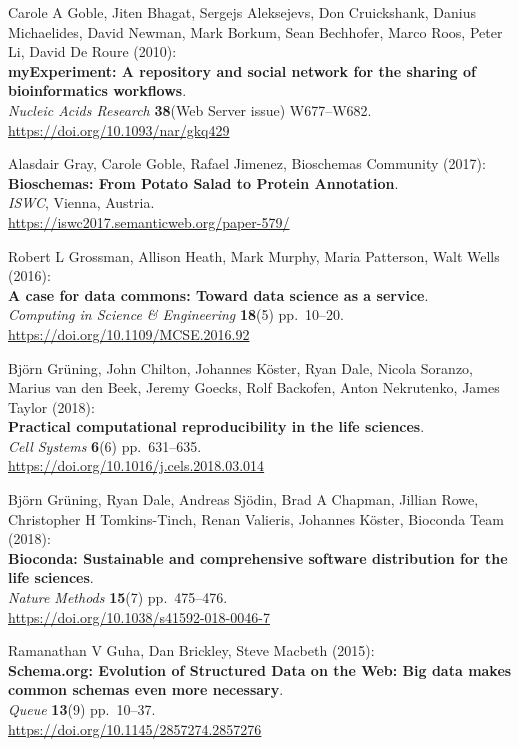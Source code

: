 \begin{thebibliography}{9}
Carole A Goble, Jiten Bhagat, Sergejs Aleksejevs, Don
Cruickshank, Danius Michaelides, David Newman, Mark Borkum, Sean
Bechhofer, Marco Roos, Peter Li, David De Roure (2010):\\
\textbf{myExperiment: A repository and social network for the sharing of
bioinformatics workflows}.\\
\emph{Nucleic Acids Research} \textbf{38}(Web Server issue)
W677--W682.\\
\url{https://doi.org/10.1093/nar/gkq429}

Alasdair Gray, Carole Goble, Rafael Jimenez, Bioschemas
Community (2017):\\
\textbf{Bioschemas: From Potato Salad to Protein Annotation}.\\
\emph{ISWC}, Vienna, Austria.\\
\url{https://iswc2017.semanticweb.org/paper-579/}

Robert L Grossman, Allison Heath, Mark Murphy, Maria Patterson,
Walt Wells (2016):\\
\textbf{A case for data commons: Toward data science as a service}.\\
\emph{Computing in Science \& Engineering} \textbf{18}(5) pp.~10--20.\\
\url{https://doi.org/10.1109/MCSE.2016.92}

Björn Grüning, John Chilton, Johannes Köster, Ryan Dale, Nicola
Soranzo, Marius van den Beek, Jeremy Goecks, Rolf Backofen, Anton
Nekrutenko, James Taylor (2018):\\
\textbf{Practical computational reproducibility in the life sciences}.\\
\emph{Cell Systems} \textbf{6}(6) pp.~631--635.\\
\url{https://doi.org/10.1016/j.cels.2018.03.014}

Björn Grüning, Ryan Dale, Andreas Sjödin, Brad A Chapman,
Jillian Rowe, Christopher H Tomkins-Tinch, Renan Valieris, Johannes
Köster, Bioconda Team (2018):\\
\textbf{Bioconda: Sustainable and comprehensive software distribution
for the life sciences}.\\
\emph{Nature Methods} \textbf{15}(7) pp.~475--476.\\
\url{https://doi.org/10.1038/s41592-018-0046-7}

Ramanathan V Guha, Dan Brickley, Steve Macbeth (2015):\\
\textbf{Schema.org: Evolution of Structured Data on the Web: Big data
makes common schemas even more necessary}.\\
\emph{Queue} \textbf{13}(9) pp.~10--37.\\
\url{https://doi.org/10.1145/2857274.2857276}


\end{thebibliography}
